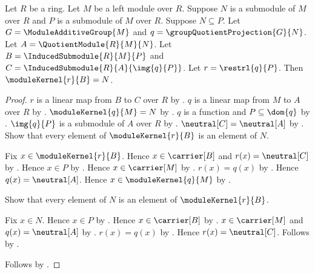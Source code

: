 \begin{theorem}\label{module_quotient_correspondence_restriction_kernel}
    Let $R$ be a ring.
    Let $M$ be a left module over $R$.
    Suppose $N$ is a submodule of $M$ over $R$ and
        $P$ is a submodule of $M$ over $R$.
    Suppose $N\subseteq P$.
    Let $G=\ModuleAdditiveGroup{M}$ and
        $q=\groupQuotientProjection{G}{N}$.
    Let $A=\QuotientModule{R}{M}{N}$.
    Let $B=\InducedSubmodule{R}{M}{P}$ and
        $C=\InducedSubmodule{R}{A}{\img{q}{P}}$.
    Let $r=\restrl{q}{P}$.
    Then $\moduleKernel{r}{B}=N$.
\end{theorem}
\begin{proof}
    $r$ is a linear map from $B$ to $C$ over $R$ by
        .
    $q$ is a linear map from $M$ to $A$ over $R$ by
        .
    $\moduleKernel{q}{M}=N$ by
        .
    $q$ is a function and $P\subseteq\dom{q}$ by
        .
    $\img{q}{P}$ is a submodule of $A$ over $R$ by
        .
    $\neutral[C]=\neutral[A]$ by
        .
    Show that every element of $\moduleKernel{r}{B}$
        is an element of $N$.
    \begin{subproof}
        Fix $x\in\moduleKernel{r}{B}$.
        Hence $x\in\carrier[B]$ and $r(x)=\neutral[C]$ by
            .
        Hence $x\in P$ by .
        Hence $x\in\carrier[M]$ by
            .
        $r(x)=q(x)$ by .
        Hence $q(x)=\neutral[A]$.
        Hence $x\in\moduleKernel{q}{M}$ by
            .
    \end{subproof}
    Show that every element of $N$ is an element of
        $\moduleKernel{r}{B}$.
    \begin{subproof}
        Fix $x\in N$.
        Hence $x\in P$ by .
        Hence $x\in\carrier[B]$ by
            .
        $x\in\carrier[M]$ and $q(x)=\neutral[A]$ by
            .
        $r(x)=q(x)$ by .
        Hence $r(x)=\neutral[C]$.
        Follows by .
    \end{subproof}
    Follows by .
\end{proof}

